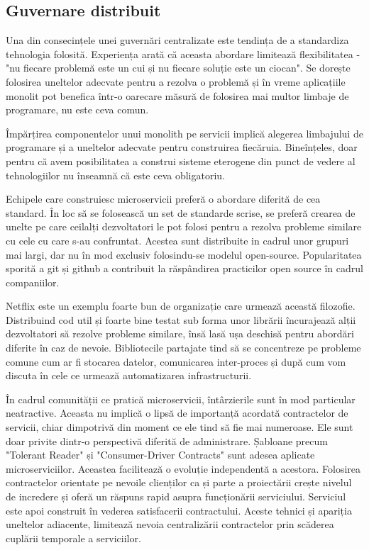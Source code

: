 \documentclass[12pt, a4paper, oneside, romanian]{teza-upb}
\begin{document}
\subsection{Guvernare distribuit}

Una din consecințele unei guvernări centralizate este tendința de a standardiza tehnologia folosită. Experiența arată că aceasta abordare limitează flexibilitatea - "nu fiecare problemă este un cui și nu fiecare soluție este un ciocan". Se dorește folosirea uneltelor adecvate pentru a rezolva o problemă și în vreme aplicațiile monolit pot benefica într-o oarecare măsură de folosirea mai multor limbaje de programare, nu este ceva comun.  

Împărțirea componentelor unui monolith pe servicii implică alegerea limbajului de programare și a uneltelor adecvate pentru construirea fiecăruia. Bineînțeles, doar pentru că avem posibilitatea a construi sisteme eterogene din punct de vedere al tehnologiilor nu înseamnă că este ceva obligatoriu. 

Echipele care construiesc microservicii preferă o abordare diferită de cea standard. În loc să se folosească un set de standarde scrise, se preferă crearea de unelte pe care ceilalți dezvoltatori le pot folosi pentru a rezolva probleme similare cu cele cu care s-au confruntat. Acestea sunt distribuite in cadrul unor grupuri mai largi, dar nu în mod exclusiv folosindu-se modelul open-source. Popularitatea sporită a git și github a contribuit la răspândirea practicilor open source în cadrul companiilor. 

Netflix este un exemplu foarte bun de organizație care urmează această filozofie. Distribuind cod util și foarte bine testat sub forma unor librării încurajează alții dezvoltatori să rezolve probleme similare, însă lasă ușa deschisă pentru abordări diferite în caz de nevoie. Bibliotecile partajate tind să se concentreze pe probleme comune cum ar fi stocarea datelor, comunicarea inter-proces și după cum vom discuta în cele ce urmează automatizarea infrastructurii.

În cadrul comunității ce pratică microservicii, întârzierile sunt în mod particular neatractive. Aceasta nu implică o lipsă de importanță acordată contractelor de servicii, chiar dimpotrivă din moment ce ele tind să fie mai numeroase. Ele sunt doar privite dintr-o perspectivă diferită de administrare. Șabloane precum "Tolerant Reader" și "Consumer-Driver Contracts" sunt adesea aplicate microserviciilor. Aceastea facilitează o evoluție independentă a acestora. Folosirea contractelor orientate pe nevoile clienților ca și parte a proiectării crește nivelul de incredere și oferă un răspuns rapid asupra funcționării serviciului. Serviciul este apoi construit în vederea satisfacerii contractului. Aceste tehnici și apariția uneltelor adiacente, limitează nevoia centralizării contractelor prin scăderea cuplării temporale a serviciilor. 
\end{document}
